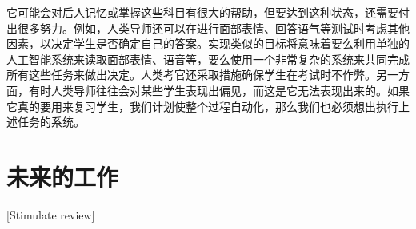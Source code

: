它可能会对后人记忆或掌握这些科目有很大的帮助，但要达到这种状态，还需要付出很多努力。例如，人类导师还可以在进行面部表情、回答语气等测试时考虑其他因素，以决定学生是否确定自己的答案。实现类似的目标将意味着要么利用单独的人工智能系统来读取面部表情、语音等，要么使用一个非常复杂的系统来共同完成所有这些任务来做出决定。人类考官还采取措施确保学生在考试时不作弊。另一方面，有时人类导师往往会对某些学生表现出偏见，而这是它无法表现出来的。如果它真的要用来复习学生，我们计划使整个过程自动化，那么我们也必须想出执行上述任务的系统。

\section{未来的工作}[Stimulate review]